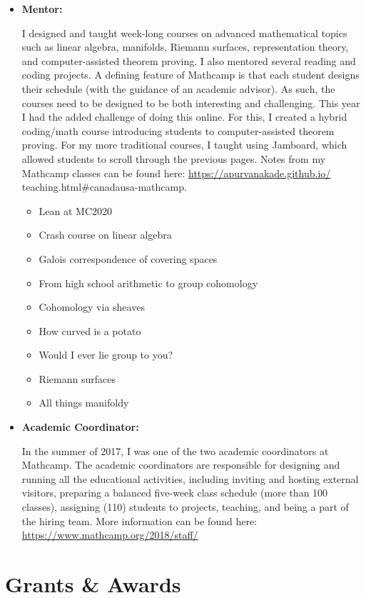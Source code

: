 \documentclass[
]{report}
\providecommand{\tightlist}{%
  \setlength{\itemsep}{0pt}\setlength{\parskip}{0pt}}
\begin{document}
\begin{itemize}
\item
  \textbf{Mentor:}

  I designed and taught week-long courses on advanced mathematical topics such as linear algebra, manifolds, Riemann surfaces, representation theory, and computer-assisted theorem proving. I also mentored several reading and coding projects. A defining feature of Mathcamp is that each student designs their schedule (with the guidance of an academic advisor). As such, the courses need to be designed to be both interesting and challenging. This year I had the added challenge of doing this online. For this, I created a hybrid coding/math course introducing students to computer-assisted theorem proving. For my more traditional courses, I taught using Jamboard, which allowed students to scroll through the previous pages. Notes from my Mathcamp classes can be found here: \url{https://apurvanakade.github.io/}
  teaching.html\#canadausa-mathcamp.

  \begin{itemize}
  \tightlist
  \item
    Lean at MC2020
  \item
    Crash course on linear algebra
  \item
    Galois correspondence of covering spaces
  \item
    From high school arithmetic to group cohomology
  \item
    Cohomology via sheaves
  \item
    How curved is a potato
  \item
    Would I ever lie group to you?
  \item
    Riemann surfaces
  \item
    All things manifoldy
  \end{itemize}
\item
  \textbf{Academic Coordinator:}

  In the summer of 2017, I was one of the two academic coordinators at Mathcamp.
  The academic coordinators are responsible for designing and running all the educational activities, including inviting and hosting external visitors, preparing a balanced five-week class schedule (more than 100 classes), assigning (110) students to projects, teaching, and being a part of the hiring team.
  More information can be found here: \url{https://www.mathcamp.org/2018/staff/}
\end{itemize}

\hypertarget{grants-awards}{%
\chapter{Grants \& Awards}\label{grants-awards}}
\end{document}
